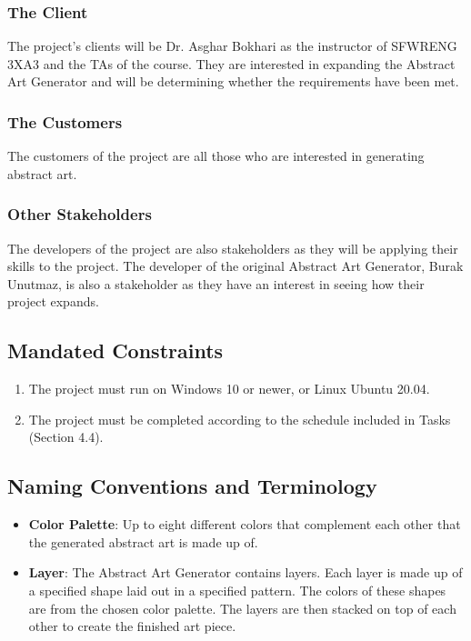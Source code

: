 \documentclass[12pt, titlepage]{article}
\begin{document}
\subsubsection{The Client}

The project's clients will be Dr. Asghar Bokhari as the instructor of SFWRENG 3XA3 and the TAs of the course. They are interested in expanding the Abstract Art Generator and will be determining whether the requirements have been met.

\subsubsection{The Customers}

The customers of the project are all those who are interested in generating abstract art. 

\subsubsection{Other Stakeholders}

The developers of the project are also stakeholders as they will be applying their skills to the project. The developer of the original Abstract Art Generator, Burak Unutmaz, is also a stakeholder as they have an interest in seeing how their project expands.

\subsection{Mandated Constraints}

\begin{enumerate}
    \item The project must run on Windows 10 or newer, or Linux Ubuntu 20.04.
    \item The project must be completed according to the schedule included in Tasks (Section 4.4).
\end{enumerate}

\subsection{Naming Conventions and Terminology}

\begin{itemize}
    \item \textbf{Color Palette}: Up to eight different colors that complement each other that the generated abstract art is made up of.
    \item \textbf{Layer}: The Abstract Art Generator contains layers. Each layer is made up of a specified shape laid out in a specified pattern. The colors of these shapes are from the chosen color palette. The layers are then stacked on top of each other to create the finished art piece.
\end{itemize}
\end{document}
